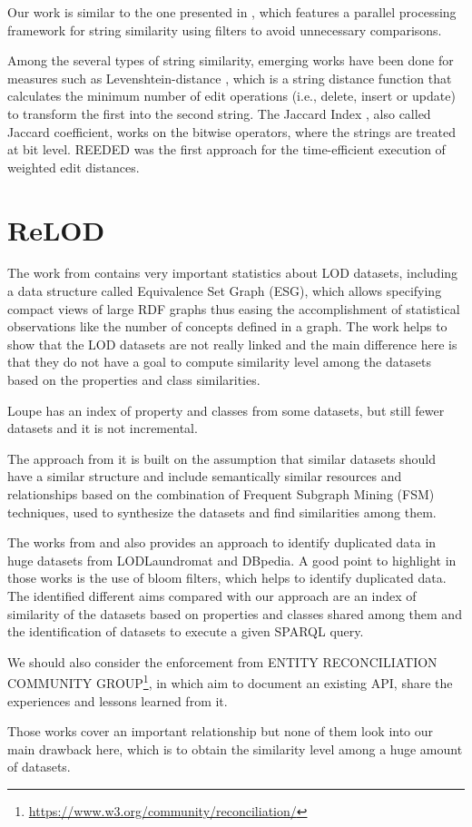 Our work is similar to the one presented in \cite{10.1371/journal.pone.0172526}, which features a parallel processing framework for string similarity using filters to avoid unnecessary comparisons. 

Among the several types of string similarity, emerging works have been done for measures such as Levenshtein-distance \cite{levenshtein1966binary}, which is a string distance function that calculates the minimum number of edit operations (i.e., delete, insert or update) to transform the first into the second string. 
The Jaccard Index \cite{jaccard1912distribution}, also called Jaccard coefficient, works on the bitwise operators, where the strings are treated at bit level. 
REEDED \cite{soru2013rapid} was the first approach for the time-efficient execution of weighted edit distances. 

\section{ReLOD}
The work from \cite{asprino2019linked,asprino2019observing,asprino2019triplifying} contains very important statistics about LOD datasets, including a data structure called Equivalence Set Graph (ESG), which allows specifying compact views of large RDF graphs thus easing the accomplishment of statistical observations like the number of concepts defined in a graph. The work helps to show that the LOD datasets are not really linked and the main difference here is that they do not have a goal to compute similarity level among the datasets based on the properties and class similarities.

Loupe \cite{mihindukulasooriya2016two} has an index of property and classes from some datasets, but still fewer datasets and it is not incremental.

The approach from \cite{emaldi2015detection} it is built on the assumption that similar datasets should have a similar structure and include semantically similar resources and relationships based on the combination of Frequent Subgraph Mining (FSM) techniques, used to synthesize the datasets and find similarities among them.

The works from \cite{baron-2016-ldow-assessing-links} and \cite{BaronKKPEH2017IDOL} also provides an approach to identify duplicated data in huge datasets from LODLaundromat and DBpedia. A good point to highlight in those works is the use of bloom filters, which helps to identify duplicated data. The identified different aims compared with our approach are an index of similarity of the datasets based on properties and classes shared among them and the identification of datasets to execute a given SPARQL query. 

We should also consider the enforcement from ENTITY RECONCILIATION COMMUNITY GROUP\footnote{\url{https://www.w3.org/community/reconciliation/}}, in which aim to document an existing API, share the experiences and lessons learned from it\cite{DBLP:journals/corr/abs-1906-08092}.

Those works cover an important relationship but none of them look into our main drawback here, which is to obtain the similarity level among a huge amount of datasets.